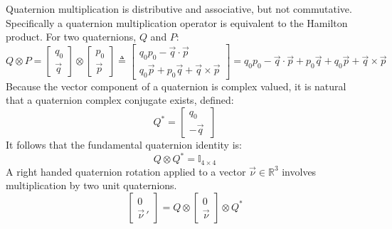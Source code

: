 Quaternion multiplication is distributive and associative, but not commutative. Specifically a quaternion multiplication operator is equivalent to the Hamilton product. For two quaternions, $Q$ and $P$:
\begin{subequations}
\begin{equation}
Q\otimes P = \begin{bmatrix}
q_0 \\
\vec{q}
\end{bmatrix}
\otimes
\begin{bmatrix}
p_0 \\
\vec{p}
\end{bmatrix}
\end{equation}
\begin{equation}
\triangleq\begin{bmatrix}
q_0p_0-\vec{q}\cdot\vec{p}\\
q_0\vec{p}+p_0\vec{q}+\vec{q}\times\vec{p}
\end{bmatrix}
\end{equation}
\begin{equation}\label{eq:quaternion-product}
=q_0 p_0 - \vec{q}\cdot \vec{p}+p_0 \vec{q} + q_0 \vec{p} + \vec{q}\times\vec{p}
\end{equation}
\end{subequations}
Because the vector component of a quaternion is complex valued, it is natural that a quaternion complex conjugate exists, defined:
\begin{equation}
Q^*=\begin{bmatrix}
q_0 \\
-\vec{q}~
\end{bmatrix}
\end{equation}
It follows that the fundamental quaternion identity is:
\begin{equation}
Q\otimes Q^* = \mathbb{I}_{4\times 4}
\end{equation}
A right handed quaternion rotation applied to a vector $\vec{\nu} \in\mathbb{R}^3$ involves multiplication by two unit quaternions. 
\begin{equation}
\begin{bmatrix}
0 \\
\vec{\nu}\hspace{2pt}'
\end{bmatrix}
=Q\otimes
\begin{bmatrix}
0 \\
\vec{\nu}
\end{bmatrix}
\otimes Q^*
\end{equation}
